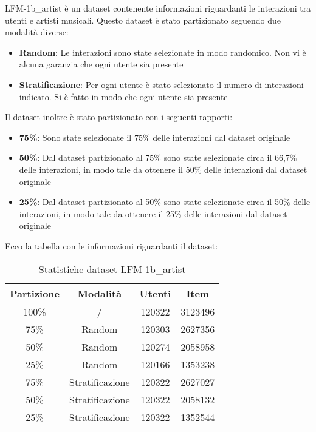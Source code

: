 
\noindent LFM-1b\_artist è un dataset contenente informazioni riguardanti le interazioni tra utenti e artisti musicali.
Questo dataset è stato partizionato seguendo due modalità diverse:
\begin{itemize}
    \item \textbf{Random}: Le interazioni sono state selezionate in modo randomico. Non vi è alcuna garanzia che ogni utente sia presente
    \item \textbf{Stratificazione}: Per ogni utente è stato selezionato il numero di interazioni indicato. Si è fatto in modo che ogni utente sia presente
\end{itemize}

Il dataset inoltre è stato partizionato con i seguenti rapporti:
\begin{itemize}
    \item \textbf{75\%}: Sono state selezionate il 75\% delle interazioni dal dataset originale
    \item \textbf{50\%}: Dal dataset partizionato al 75\% sono state selezionate circa il 66,7\% delle interazioni, in modo tale da ottenere il 50\% delle interazioni dal dataset originale
    \item \textbf{25\%}: Dal dataset partizionato al 50\% sono state selezionate circa il 50\% delle interazioni, in modo tale da ottenere il 25\% delle interazioni dal dataset originale
\end{itemize}


Ecco la tabella con le informazioni riguardanti il dataset:
\begin{table}[H]
    \centering
    \begin{tabular}{|c|c|c|c|}
        \hline
        \textbf{Partizione} & \textbf{Modalità} & \textbf{Utenti} & \textbf{Item} \\
        \hline
        \hline
        100\% & /  & 120322 & 3123496 \\
        \hline
        75\% & Random  & 120303 & 2627356\\
        \hline
        50\% & Random  & 120274 & 2058958 \\
        \hline
        25\% & Random  & 120166 & 1353238 \\
        \hline
        75\% & Stratificazione & 120322 & 2627027\\
        \hline
        50\% & Stratificazione & 120322 & 2058132 \\
        \hline
        25\% & Stratificazione & 120322 & 1352544 \\
        \hline
    \end{tabular}
    \caption{Statistiche dataset LFM-1b\_artist}
\end{table}

